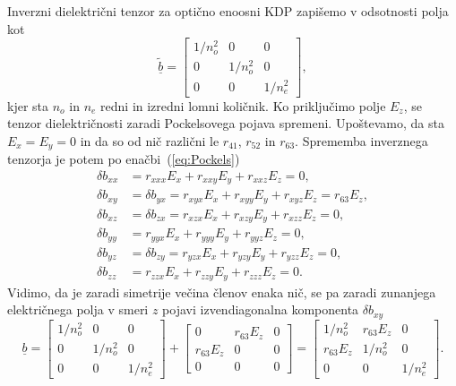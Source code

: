 Inverzni dielektrični tenzor za optično enoosni KDP zapišemo v odsotnosti polja kot
\begin{equation}
\underline{\tilde{b}} = 
\left[\begin{array}{ccc}
1/n_o^2 & 0& 0\\
0 & 1/n_o^2& 0\\
0 & 0&  1/n_e^2
\end{array}\right],
\label{7.8}
\end{equation}
kjer sta $n_o$ in $n_e$ redni in izredni lomni količnik. Ko priključimo 
polje $E_z$, se tenzor dielektričnosti zaradi Pockelsovega pojava spremeni. Upoštevamo,
da sta $E_x=E_y=0$ in da so od nič različni le $r_{41}$, $r_{52}$ in $r_{63}$. 
Sprememba inverznega tenzorja je potem po enačbi~(\ref{eq:Pockels})
\begin{align}
\delta b_{xx} & =r_{xxx}E_x + r_{xxy}E_y + r_{xxz}E_z = 0,\nonumber \\
\delta b_{xy} & = \delta b_{yx} = r_{xyx}E_x + r_{xyy}E_y + r_{xyz}E_z = r_{63}E_z,\nonumber\\
\delta b_{xz} & = \delta b_{zx} = r_{xzx}E_x + r_{xzy}E_y + r_{xzz}E_z = 0,\nonumber\\
\delta b_{yy} & = r_{yyx}E_x + r_{yyy}E_y + r_{yyz}E_z= 0,\nonumber\\
\delta b_{yz} & = \delta b_{zy} = r_{yzx}E_x + r_{yzy}E_y + r_{yzz}E_z= 0,\nonumber\\
\delta b_{zz} & = r_{zzx}E_x + r_{zzy}E_y + r_{zzz}E_z = 0.
\end{align}
Vidimo, da je zaradi simetrije večina členov enaka nič, se pa zaradi zunanjega električnega
polja v smeri $z$ pojavi izvendiagonalna komponenta $\delta b_{xy}$
\begin{equation}
\underline{b} = 
\left[\begin{array}{ccc}
1/n_o^2 & 0& 0\\
0 & 1/n_o^2 & 0\\
0 & 0& 1/n_e^2
\end{array}\right] + \left[\begin{array}{ccc}
 0& r_{63}E_z& 0\\
r_{63}E_z & 0 & 0\\
0 & 0&  0
\end{array}\right] = \left[\begin{array}{ccc}
1/n_o^2 & r_{63}E_z& 0\\
r_{63}E_z& 1/n_o^2 & 0\\
0 & 0&  1/n_e^2
\end{array}\right].
\label{7.8a}
\end{equation}
